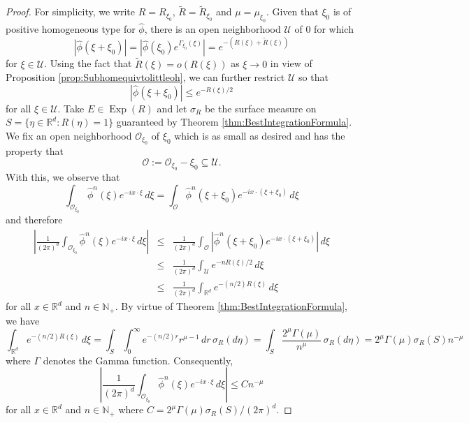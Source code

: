 \documentclass[11pt, letter]{book}
\newcommand\Exp{\operatorname{Exp}}
\begin{document}
\begin{proof}
For simplicity, we write $R=R_{\xi_0}$, $\widetilde{R}=\widetilde{R}_{\xi_0}$ and $\mu=\mu_{\xi_0}$. Given that $\xi_0$ is of positive homogeneous type for $\widehat{\phi}$, there is an open neighborhood $\mathcal{U}$ of $0$ for which
\begin{equation*}
    \left|\widehat{\phi}(\xi+\xi_0)\right|=\left|\widehat{\phi}(\xi_0)e^{\Gamma_{\xi_0}(\xi)}\right|=e^{-\left(R(\xi)+\widetilde{R}(\xi)\right)}
\end{equation*}
for $\xi\in \mathcal{U}$. Using the fact that $\widetilde{R}(\xi)=o(R(\xi))$ as $\xi\to 0$ in view of Proposition \ref{prop:Subhomequivtolittleoh}, we can further restrict $\mathcal{U}$ so that
\begin{equation*}
    \left|\widehat{\phi}(\xi+\xi_0)\right|\leq e^{-R(\xi)/2}
\end{equation*}
for all $\xi\in\mathcal{U}$. Take $E\in\Exp(R)$ and let $\sigma_R$ be the surface measure on  $S=\{\eta\in\mathbb{R}^d:R(\eta)=1\}$ guaranteed by Theorem \ref{thm:BestIntegrationFormula}. We fix an open neighborhood $\mathcal{O}_{\xi_0}$ of $\xi_0$ which is as small as desired and has the property that
\begin{equation*}
    \mathcal{O}:=\mathcal{O}_{\xi_0}-\xi_0\subseteq\mathcal{U}.
\end{equation*}
With this, we observe that
\begin{equation}\label{eq:WlogCenterAtZero}
\int_{\mathcal{O}_{\xi_0}}\widehat{\phi}^n(\xi)e^{-ix\cdot\xi}\,d\xi=\int_{\mathcal{O}}\widehat{\phi}^n(\xi+\xi_0)e^{-ix\cdot(\xi+\xi_0)}\,d\xi
\end{equation}
and therefore
\begin{eqnarray*}
    \left|\frac{1}{(2\pi)^d}\int_{\mathcal{O}_{\xi_0}}\widehat{\phi}^n(\xi)e^{-ix\cdot\xi}\,d\xi\right|&\leq& \frac{1}{(2\pi)^d}\int_{\mathcal{O}}\left|\widehat{\phi}^n(\xi+\xi_0)e^{-i x\cdot(\xi+\xi_0)}\right|\,d\xi\\
    &\leq& \frac{1}{(2\pi)^d}\int_{\mathcal{U}}e^{-nR(\xi)/2}\,d\xi\\
    &\leq&\frac{1}{(2\pi)^d}\int_{\mathbb{R}^d} e^{-(n/2)R(\xi)}\,d\xi
\end{eqnarray*}
for all $x\in\mathbb{R}^d$ and $n\in\mathbb{N}_+$. By virtue of Theorem \ref{thm:BestIntegrationFormula}, we have
\begin{equation*}
\int_{\mathbb{R}^d}e^{-(n/2)R(\xi)}\,d\xi=\int_S \int_0^\infty e^{-(n/2)r}r^{\mu-1}\,dr\,\sigma_R(d\eta)=\int_S \frac{2^\mu\Gamma(\mu)}{n^{\mu}}\,\sigma_R(d\eta)=2^\mu\Gamma(\mu)\sigma_R(S)n^{-\mu}
\end{equation*}
where $\Gamma$ denotes the Gamma function. Consequently,
\begin{equation*}
    \left|\frac{1}{(2\pi)^d}\int_{\mathcal{O}_{\xi_0}}\widehat{\phi}^n(\xi)e^{-ix\cdot\xi}\,d\xi\right|\leq C n^{-\mu}
\end{equation*}
for all $x\in\mathbb{R}^d$ and $n\in\mathbb{N}_+$ where $C=2^\mu \Gamma(\mu)\sigma_R(S)/(2\pi)^d.$
\end{proof}
\end{document}
